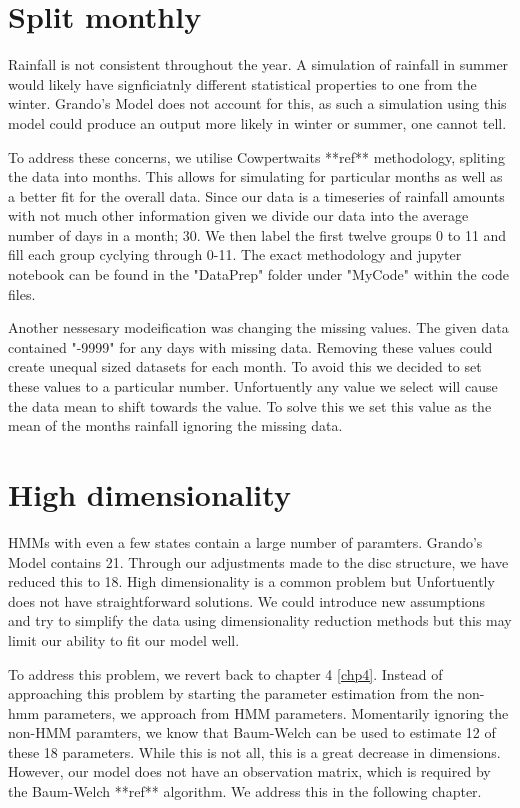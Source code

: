 \section{Split monthly}

Rainfall is not consistent throughout the year. A simulation of rainfall in summer would likely have signficiatnly different statistical properties to one from the winter. Grando's Model does not account for this, as such a simulation using this model could produce an output more likely in winter or summer, one cannot tell. 

To address these concerns, we utilise Cowpertwaits **ref** methodology, spliting the data into months. This allows for simulating for particular months as well as a better fit for the overall data. Since our data is a timeseries of rainfall amounts with not much other information given we divide our data into the average number of days in a month; 30. We then label the first twelve groups 0 to 11 and fill each group cyclying through 0-11. The exact methodology and jupyter notebook can be found in the "DataPrep" folder under "MyCode" within the code files. 

Another nessesary modeification was changing the missing values. The given data contained "-9999" for any days with missing data. Removing these values could create unequal sized datasets for each month. To avoid this we decided to set these values to a particular number. Unfortuently any value we select will cause the data mean to shift towards the value. To solve this we set this value as the mean of the months rainfall ignoring the missing data. 

\section{High dimensionality}

HMMs with even a few states contain a large number of paramters. Grando's Model contains 21. Through our adjustments made to the disc structure, we have reduced this to 18. High dimensionality is a common problem but Unfortuently does not have straightforward solutions. We could introduce new assumptions and try to simplify the data using dimensionality reduction methods but this may limit our ability to fit our model well. 

To address this problem, we revert back to chapter 4 \ref{chp4}. Instead of approaching this problem by starting the parameter estimation from the non-hmm parameters, we approach from HMM parameters. Momentarily ignoring the non-HMM paramters, we know that Baum-Welch can be used to estimate 12 of these 18 parameters. While this is not all, this is a great decrease in dimensions. However, our model does not have an observation matrix, which is required by the Baum-Welch **ref** algorithm. We address this in the following chapter.

